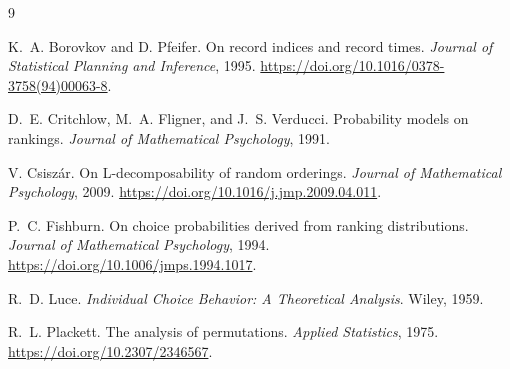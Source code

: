 \documentclass[11pt]{article}
\theoremstyle{definition}
\newcommand{\1}{\mathbf{1}}
\begin{document}
\begin{thebibliography}{9}

K.~A. Borovkov and D. Pfeifer.
\newblock On record indices and record times.
\newblock \emph{Journal of Statistical Planning and Inference}, 1995.
\newblock \url{https://doi.org/10.1016/0378-3758(94)00063-8}.

D.~E. Critchlow, M.~A. Fligner, and J.~S. Verducci.
\newblock Probability models on rankings.
\newblock \emph{Journal of Mathematical Psychology}, 1991.

V. Csisz\'ar.
\newblock On L-decomposability of random orderings.
\newblock \emph{Journal of Mathematical Psychology}, 2009.
\newblock \url{https://doi.org/10.1016/j.jmp.2009.04.011}.

P.~C. Fishburn.
\newblock On choice probabilities derived from ranking distributions.
\newblock \emph{Journal of Mathematical Psychology}, 1994.
\newblock \url{https://doi.org/10.1006/jmps.1994.1017}.

R.~D. Luce.
\newblock \emph{Individual Choice Behavior: A Theoretical Analysis}.
\newblock Wiley, 1959.

R.~L. Plackett.
\newblock The analysis of permutations.
\newblock \emph{Applied Statistics}, 1975.
\newblock \url{https://doi.org/10.2307/2346567}.

\end{thebibliography}
\end{document}
